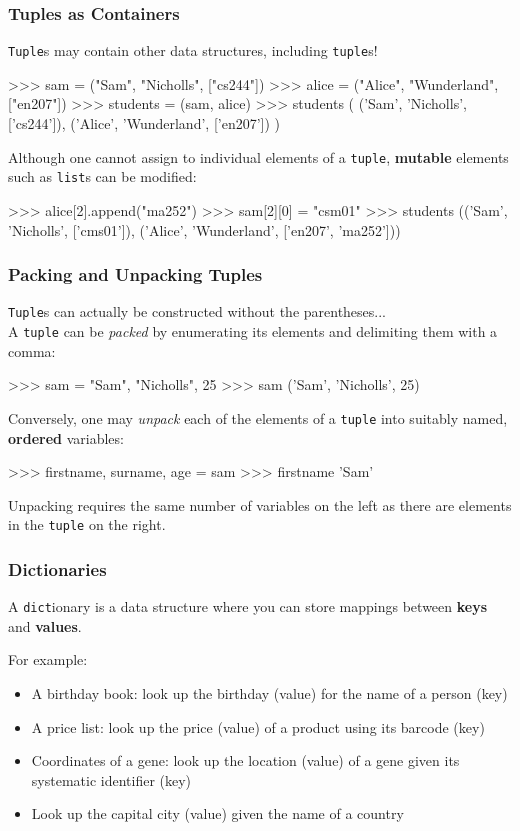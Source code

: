 \documentclass{beamer}
\begin{document}
\begin{frame}[fragile]
\frametitle{Tuples as Containers}
    \texttt{Tuple}s may contain other data structures, including \texttt{tuple}s!

\begin{code}
>>> sam = ("Sam", "Nicholls", ["cs244"])
>>> alice = ("Alice", "Wunderland", ["en207"])
>>> students = (sam, alice)
>>> students
(
    ('Sam', 'Nicholls', ['cs244']),
    ('Alice', 'Wunderland', ['en207'])
)
\end{code}
Although one cannot assign to individual elements of a \texttt{tuple}, \textbf{mutable}
elements such as \texttt{list}s can be modified:
\begin{code}
>>> alice[2].append("ma252")
>>> sam[2][0] = "csm01"
>>> students
(('Sam', 'Nicholls', ['cms01']),
('Alice', 'Wunderland', ['en207', 'ma252']))
\end{code}
\end{frame}


\begin{frame}[fragile]
\frametitle{Packing and Unpacking Tuples}
\texttt{Tuple}s can actually be constructed without the parentheses...\\
A \texttt{tuple} can be \textit{packed} by enumerating its elements
and delimiting them with a comma:

\begin{code}
>>> sam = "Sam", "Nicholls", 25
>>> sam
('Sam', 'Nicholls', 25)
\end{code}

\vskip 0.3cm
Conversely, one may \textit{unpack} each of the elements of a \texttt{tuple}
    into suitably named, \textbf{ordered} variables:
\begin{code}
>>> firstname, surname, age = sam
>>> firstname
'Sam'
\end{code}
Unpacking requires the same number of variables on the left as there
    are elements in the \texttt{tuple} on the right.
\end{frame}

\begin{frame}[fragile]
\frametitle{Dictionaries}
    A \texttt{dict}ionary is a data structure where you can store
    mappings between \textbf{keys} and \textbf{values}.

For example:
\begin{itemize}
\item A birthday book: look up the birthday (value) for the
name of a person (key)
\item A price list: look up the price (value) of a product
using its barcode (key)
\item Coordinates of a gene: look up the location (value)
of a gene given its systematic identifier (key)
\item Look up the capital city (value) given the name of a
country
\end{itemize}
\end{frame}
\end{document}
